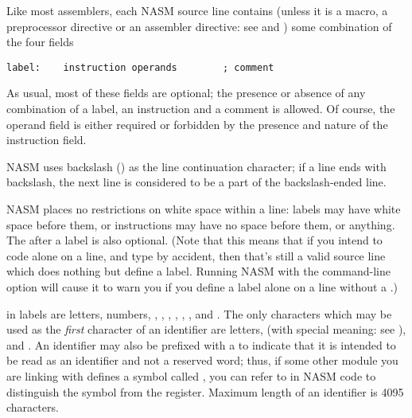 %
%


Like most assemblers, each NASM source line contains (unless it
is a macro, a preprocessor directive or an assembler directive: see
 and ) some combination
of the four fields

\begin{lstlisting}
label:    instruction operands        ; comment
\end{lstlisting}

As usual, most of these fields are optional; the presence or absence
of any combination of a label, an instruction and a comment is allowed.
Of course, the operand field is either required or forbidden by the
presence and nature of the instruction field.

NASM uses backslash (\code{\textbackslash}) as the line continuation character;
if a line ends with backslash, the next line is considered to be
a part of the backslash-ended line.

NASM places no restrictions on white space within a line: labels may
have white space before them, or instructions may have no space
before them, or anything. The  after a label is also
optional. (Note that this means that if you intend to code 
alone on a line, and type  by accident, then that's still a
valid source line which does nothing but define a label. Running
NASM with the command-line option 
will cause it to warn you if you define a label alone on a line without
a .)

 in labels are letters, numbers, \code{\_},
\code{\$}, \code{\#}, \code{\@}, \code{~}, , and .
The only characters which may be used as the \emph{first} character of
an identifier are letters, \code{\.} (with special meaning: see
), \code{\_} and .
An identifier may also be prefixed with a \codeindex{\$} to indicate
that it is intended to be read as an identifier and not a reserved word;
thus, if some other module you are linking with defines a symbol called
, you can refer to  in NASM code to distinguish
the symbol from the register. Maximum length of an identifier is
4095 characters.

